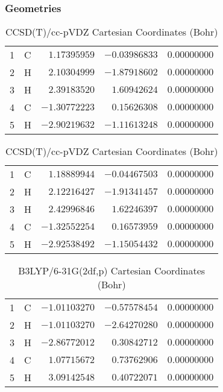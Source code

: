\documentclass[10pt,oneside]{article}
\begin{document}
\begin{table}[h!]
\subsubsection*{Geometries}
\begin{multicols}{2}
\centering
\caption{CCSD(T)/cc-pVTZ Cartesian Coordinates (Bohr)}
\begin{tabular}{llrrr}
\toprule
1  & C  & $ 1.17395959$ & $-0.03986833$ & $ 0.00000000$ \\
2  & H  & $ 2.10304999$ & $-1.87918602$ & $ 0.00000000$ \\
3  & H  & $ 2.39183520$ & $ 1.60942624$ & $ 0.00000000$ \\
4  & C  & $-1.30772223$ & $ 0.15626308$ & $ 0.00000000$ \\
5  & H  & $-2.90219632$ & $-1.11613248$ & $ 0.00000000$ \\
\bottomrule
\end{tabular}
\caption{CCSD(T)/cc-pVDZ Cartesian Coordinates (Bohr)}
\begin{tabular}{llrrr}
\toprule
1  & C  & $ 1.18889944$ & $-0.04467503$ & $ 0.00000000$ \\
2  & H  & $ 2.12216427$ & $-1.91341457$ & $ 0.00000000$ \\
3  & H  & $ 2.42996846$ & $ 1.62246397$ & $ 0.00000000$ \\
4  & C  & $-1.32552254$ & $ 0.16573959$ & $ 0.00000000$ \\
5  & H  & $-2.92538492$ & $-1.15054432$ & $ 0.00000000$ \\
\bottomrule
\end{tabular}
\end{multicols}
\end{table}

\begin{table}[h]
\centering
\caption{B3LYP/6-31G(2df,p) Cartesian Coordinates (Bohr)}
\begin{tabular}{llrrr}
\toprule
1  & C  & $-1.01103270$ & $-0.57578454$ & $ 0.00000000$ \\
2  & H  & $-1.01103270$ & $-2.64270280$ & $ 0.00000000$ \\
3  & H  & $-2.86772012$ & $ 0.30842712$ & $ 0.00000000$ \\
4  & C  & $ 1.07715672$ & $ 0.73762906$ & $ 0.00000000$ \\
5  & H  & $ 3.09142548$ & $ 0.40722071$ & $ 0.00000000$ \\
\bottomrule
\end{tabular}
\end{table}
\end{document}
